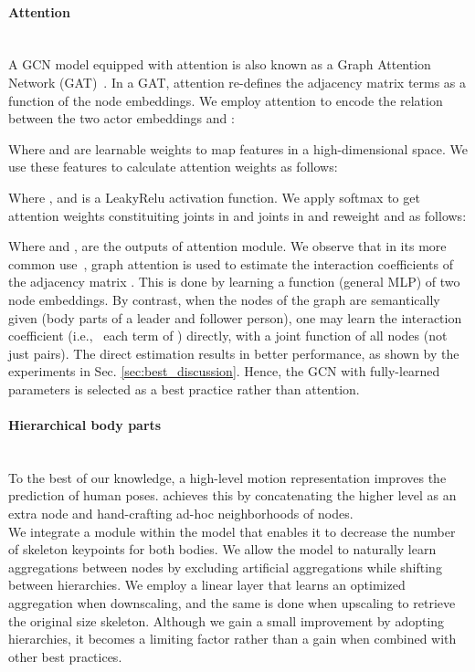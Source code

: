 \documentclass[10pt,twocolumn,letterpaper]{article}
\begin{document}
\paragraph{Attention} ~\\
A GCN model equipped with attention is also known as a Graph Attention Network (GAT)~\cite{velickovic18}. In a GAT, attention re-defines the adjacency matrix terms as a function of the node embeddings. We employ attention to encode the relation between the two actor embeddings  and :

Where  and  are learnable weights to map features in a high-dimensional space. We use these features to calculate attention weights as follows:

Where ,  and  is a LeakyRelu activation function. We apply softmax to get attention weights  constituiting  joints in  and  joints in  and reweight  and  as follows: 

Where  and ,  are the outputs of attention module. 
We observe that in its more common use~\cite{velickovic18}, graph attention is used to estimate the interaction coefficients of the adjacency matrix .
This is done by learning a function (general MLP) of two node embeddings.
By contrast, when the nodes of the graph are semantically given (body parts of a leader and follower person), one may learn the interaction coefficient (i.e., \ each term of ) directly, with a joint function of all nodes (not just pairs).
The direct estimation results in better performance, as shown by the experiments in Sec. \ref{sec:best_discussion}. Hence, the GCN with fully-learned parameters is selected as a best practice rather than attention.

\paragraph{Hierarchical body parts} ~\\
To the best of our knowledge, a high-level motion representation improves the prediction of human poses\cite{Li_2020_CVPR}.
\cite{Dang21} achieves this by concatenating the higher level as an extra node and hand-crafting ad-hoc neighborhoods of nodes. \\
We integrate a module within the model that enables it to decrease the number of skeleton keypoints for both bodies.
We allow the model to naturally learn aggregations between nodes by excluding artificial aggregations while shifting between hierarchies.
We employ a linear layer that learns an optimized aggregation when downscaling, and the same is done when upscaling to retrieve the original size skeleton. Although we gain a small improvement by adopting hierarchies, it becomes a limiting factor rather than a gain when combined with other best practices.
\end{document}
